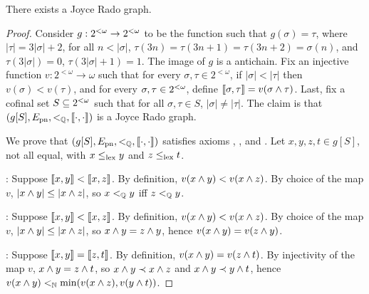 \begin{theorem}[$\RCA_0$]\label{thm:joyce-rado-graph-exists}
  There exists a Joyce Rado graph.
\end{theorem}
\begin{proof}
  Consider $g:{2^{<\omega}}\to{2^{<\omega}}$ to be the function such that $g(\sigma)=\tau$, where $|\tau|=3|\sigma|+2$, for all $n<|\sigma|$, $\tau(3n)=\tau(3n+1)=\tau(3n+2)=\sigma(n)$, and $\tau(3|\sigma|)=0$, $\tau(3|\sigma|+1)=1$. The image of $g$ is a antichain. %
  Fix an injective function $v: 2^{<\omega} \to \omega$ such that 
for every $\sigma, \tau \in 2^{<\omega}$, if $|\sigma| < |\tau|$ then $v(\sigma) < v(\tau)$,
and for every $\sigma, \tau \in {2^{<\omega}}$, define $\llbracket \sigma , \tau \rrbracket = v(\sigma \wedge \tau)$.
Last, fix a cofinal set $S\subseteq{2^{<\omega}}$ such that for all $\sigma,\tau\in S$, $|\sigma|\neq|\tau|$. The claim is that $(g[S], E_{\mathrm{pn}}, <_{\mathbb{Q}}, \llbracket \cdot , \cdot \rrbracket)$ is a Joyce Rado graph.

We prove that $(g[S], E_{\mathrm{pn}}, <_{\mathbb{Q}}, \llbracket \cdot , \cdot \rrbracket)$ satisfies axioms , ,  and .
Let $x, y, z, t \in g[S]$, not all equal, with $x \leq_{\mathrm{lex}} y$ and $z \leq_{\mathrm{lex}} t$.

: Suppose $\llbracket x , y \rrbracket < \llbracket x , z \rrbracket$. By definition, $v(x \wedge y) < v(x \wedge z)$. By choice of the map $v$,  $|x \wedge y| \leq |x \wedge z|$, so $x <_{\mathbb{Q}} y$ iff $z <_{\mathbb{Q}} y$.

: Suppose $\llbracket x , y \rrbracket < \llbracket x , z \rrbracket$. By definition, $v(x \wedge y) < v(x \wedge z)$. By choice of the map $v$,  $|x \wedge y| \leq |x \wedge z|$, so $x \wedge y = z \wedge y$, hence $v(x \wedge y) = v(z \wedge y)$.

: Suppose $\llbracket x , y \rrbracket = \llbracket z , t \rrbracket$. By definition, $v(x \wedge y) = v(z \wedge t)$. By injectivity of the map $v$, $x \wedge y = z \wedge t$, so $x \wedge y \prec x \wedge z$ and $x \wedge y \prec y \wedge t$, hence $v(x \wedge y) <_{\mathbb{N}} \min(v(x \wedge z), v(y \wedge t))$.


\end{proof}
